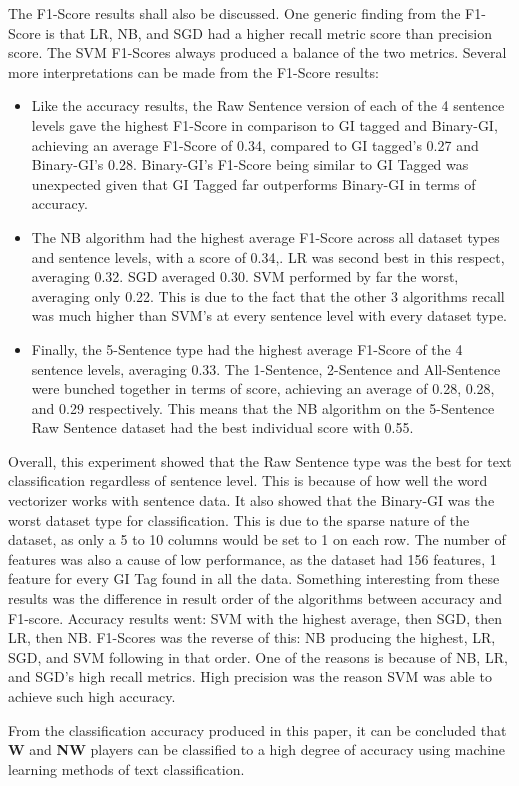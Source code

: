 \documentclass[oneside,12pt]{Classes/RoboticsLaTeX}
\begin{document}
The F1-Score results shall also be discussed. One generic finding from the F1-Score is that LR, NB, and SGD had a higher recall metric score than precision score. The SVM F1-Scores always produced a balance of the two metrics. 
Several more interpretations can be made from the F1-Score results:
\begin{itemize}
  \item Like the accuracy results, the Raw Sentence version of each of the 4 sentence levels gave the highest F1-Score in comparison to GI tagged and Binary-GI, achieving an average F1-Score of 0.34, compared to GI tagged's 0.27 
         and Binary-GI's 0.28. Binary-GI's F1-Score being similar to GI Tagged was unexpected given that GI Tagged far outperforms Binary-GI in terms of accuracy.
  \item The NB algorithm had the highest average F1-Score across all dataset types and sentence levels, with a score of 0.34,. LR was second best in this respect,
        averaging 0.32. SGD averaged 0.30. SVM performed by far the worst, averaging only 0.22. This is due to the fact that the other 3 algorithms recall was much higher than SVM's at every sentence level with every dataset type.
  \item Finally, the 5-Sentence type had the highest average F1-Score of the 4 sentence levels, averaging 0.33. The 1-Sentence, 2-Sentence and All-Sentence were bunched together in terms of score, achieving an average of 0.28, 0.28, and
        0.29 respectively. This means that the NB algorithm on the 5-Sentence Raw Sentence dataset had the best individual score with 0.55.
\end{itemize}

Overall, this experiment showed that the Raw Sentence type was the best for text classification regardless of sentence level. This is because of how well the word vectorizer works with sentence data. It also showed that the Binary-GI was the worst
dataset type for classification. This is due to the sparse nature of the dataset, as only a 5 to 10 columns would be set to 1 on each row. The number of features was also a cause of low performance, as the dataset had 156 features, 1 feature for every 
GI Tag found in all the data. Something interesting from these results was the difference in result order of the algorithms between accuracy and F1-score. Accuracy results went: SVM with the highest average, then SGD, then LR, then NB. F1-Scores was the 
reverse of this: NB producing the highest, LR, SGD, and SVM following in that order. One of the reasons is because of NB, LR, and SGD's high recall metrics. High precision was the reason SVM was able to achieve such high accuracy. \par
From the classification accuracy produced in this paper, it can be concluded that \textbf{W} and \textbf{NW} players can be classified to a high degree of accuracy using machine learning methods of text classification. 
\end{document}
